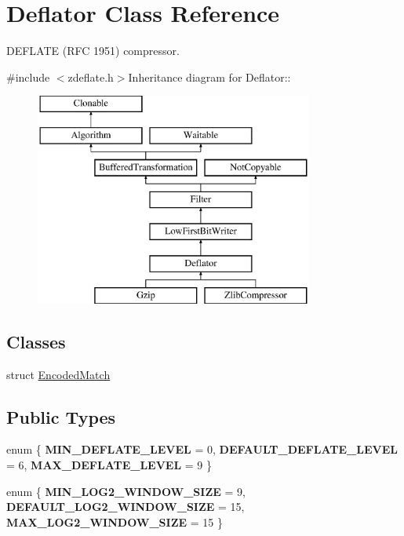 \hypertarget{class_deflator}{
\section{Deflator Class Reference}
\label{class_deflator}
}


DEFLATE (RFC 1951) compressor.  


{\ttfamily \#include $<$zdeflate.h$>$}Inheritance diagram for Deflator::\begin{figure}[H]
\begin{center}
\leavevmode
\includegraphics[height=7cm]{class_deflator}
\end{center}
\end{figure}
\subsection*{Classes}
\begin{DoxyCompactItemize}
\item 
struct \hyperlink{struct_deflator_1_1_encoded_match}{EncodedMatch}
\end{DoxyCompactItemize}
\subsection*{Public Types}
\begin{DoxyCompactItemize}
\item 
enum \{ {\bfseries MIN\_\-DEFLATE\_\-LEVEL} =  0, 
{\bfseries DEFAULT\_\-DEFLATE\_\-LEVEL} =  6, 
{\bfseries MAX\_\-DEFLATE\_\-LEVEL} =  9
 \}
\item 
enum \{ {\bfseries MIN\_\-LOG2\_\-WINDOW\_\-SIZE} =  9, 
{\bfseries DEFAULT\_\-LOG2\_\-WINDOW\_\-SIZE} =  15, 
{\bfseries MAX\_\-LOG2\_\-WINDOW\_\-SIZE} =  15
 \}
\end{DoxyCompactItemize}
